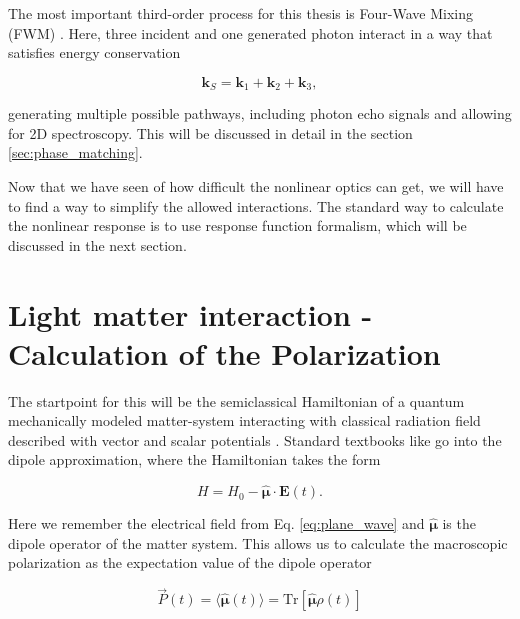 \noindent
The most important third-order process for this thesis is Four-Wave Mixing (FWM) \cite{boyd2008chapter6nonlinear}. Here, three incident and one generated photon interact in a way that satisfies energy conservation

\begin{equation}
	\mathbf{k}_S = \mathbf{k}_1 + \mathbf{k}_2 + \mathbf{k}_3,
	\label{eq:four_wave_mixing}
\end{equation}

\noindent
generating multiple possible pathways, including photon echo signals and allowing for 2D spectroscopy. This will be discussed in detail in the section \ref{sec:phase_matching}.

\noindent
Now that we have seen of how difficult the nonlinear optics can get, we will have to find a way to simplify the allowed interactions. The standard way to calculate the nonlinear response is to use response function formalism, which will be discussed in the next section.

\section{Light matter interaction - Calculation of the Polarization}
\label{sec:response_functions}

\noindent
The startpoint for this will be the semiclassical Hamiltonian of a quantum mechanically modeled matter-system interacting with classical radiation field described with vector and scalar potentials .
Standard textbooks like \cite{garrisonchiao2008quantumoptics,gerryknight2024introductoryquantumoptics} go into the dipole approximation, where the Hamiltonian takes the form

\begin{equation}
	H = H_0 - \mathbf{\hat{\mu}} \cdot \mathbf{E}(t).
\end{equation}

\noindent
Here we remember the electrical field from Eq. \ref{eq:plane_wave} and $\mathbf{\hat{\mu}}$ is the dipole operator of the matter system. This allows us to calculate the macroscopic polarization as the expectation value of the dipole operator

\begin{equation}
	\vec{P}(t) = \langle \mathbf{\hat{\mu}}(t) \rangle = \mathrm{Tr}[\mathbf{\hat{\mu}} \rho(t)]
	\label{eq:polarization_expectation_value}
\end{equation}

